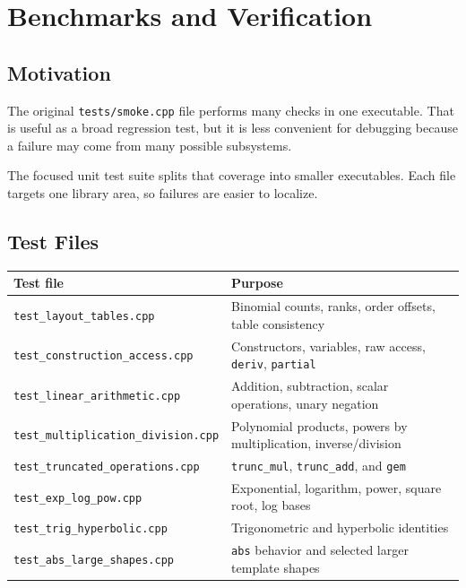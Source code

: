 \documentclass[11pt]{article}
\begin{document}
\section{Benchmarks and Verification}

\subsection{Motivation}

The original \texttt{tests/smoke.cpp} file performs many checks in one
executable. That is useful as a broad regression test, but it is less
convenient for debugging because a failure may come from many possible
subsystems.

The focused unit test suite splits that coverage into smaller executables.
Each file targets one library area, so failures are easier to localize.

\subsection{Test Files}

\begin{center}
\begin{tabular}{ll}
\toprule
Test file & Purpose \\
\midrule
\texttt{test\_layout\_tables.cpp} & Binomial counts, ranks, order offsets, table consistency \\
\texttt{test\_construction\_access.cpp} & Constructors, variables, raw access, \texttt{deriv}, \texttt{partial} \\
\texttt{test\_linear\_arithmetic.cpp} & Addition, subtraction, scalar operations, unary negation \\
\texttt{test\_multiplication\_division.cpp} & Polynomial products, powers by multiplication, inverse/division \\
\texttt{test\_truncated\_operations.cpp} & \texttt{trunc\_mul}, \texttt{trunc\_add}, and \texttt{gem} \\
\texttt{test\_exp\_log\_pow.cpp} & Exponential, logarithm, power, square root, log bases \\
\texttt{test\_trig\_hyperbolic.cpp} & Trigonometric and hyperbolic identities \\
\texttt{test\_abs\_large\_shapes.cpp} & \texttt{abs} behavior and selected larger template shapes \\
\bottomrule
\end{tabular}
\end{center}
\end{document}
